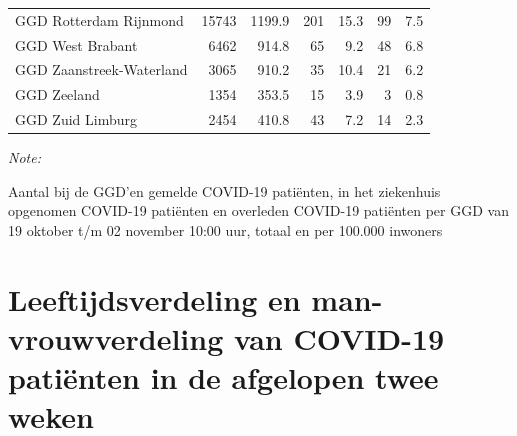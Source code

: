 \documentclass[
  english,
  man,floatsintext]{apa6}
\begin{document}
\begin{table}[H]
\begin{threeparttable}
\begin{tabular}{lrrrrrr}
GGD Rotterdam Rijnmond & 15743 & 1199.9 & 201 & 15.3 & 99 & 7.5\\
GGD West Brabant & 6462 & 914.8 & 65 & 9.2 & 48 & 6.8\\
GGD Zaanstreek-Waterland & 3065 & 910.2 & 35 & 10.4 & 21 & 6.2\\
GGD Zeeland & 1354 & 353.5 & 15 & 3.9 & 3 & 0.8\\
GGD Zuid Limburg & 2454 & 410.8 & 43 & 7.2 & 14 & 2.3\\
\bottomrule
\end{tabular}
\begin{tablenotes}
\item \textit{Note: } 
\item Aantal bij de GGD’en gemelde COVID-19 patiënten, in het ziekenhuis opgenomen COVID-19 patiënten en overleden COVID-19 patiënten per GGD van 19 oktober t/m 02 november 10:00 uur, totaal en per 100.000 inwoners
\end{tablenotes}
\end{threeparttable}
\endgroup{}
\end{table}

\newpage

\hypertarget{leeftijdsverdeling-en-man-vrouwverdeling-van-covid-19-patiuxebnten-in-de-afgelopen-twee-weken}{%
\section{Leeftijdsverdeling en man-vrouwverdeling van COVID-19 patiënten in de afgelopen twee weken}\label{leeftijdsverdeling-en-man-vrouwverdeling-van-covid-19-patiuxebnten-in-de-afgelopen-twee-weken}}
\end{document}
